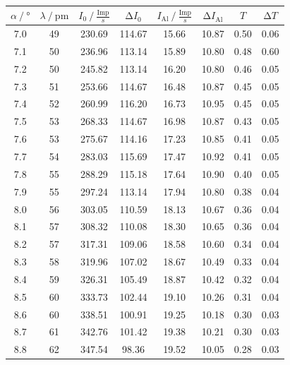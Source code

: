 \begin{table}[H]    
    \centering
    \caption{}
    \label{Tabelle3}
    \begin{tabular} {c  c| c  c|  c  c|  c|  c}
        \toprule
        {$ \alpha \mathbin{/} \unit{\degree}$} &
        {$ \lambda \mathbin{/} \unit{\pico\meter}$} &
        {$ I_{0} \mathbin{/} \frac{\text{Imp}}{s} $} &
        {$ \increment I_{0} $} &
        {$ I_{\text{Al}} \mathbin{/} \frac{\text{Imp}}{s} $} &
        {$ \increment I_{\text{Al}} $} &
        {$ T $} &
        {$ \increment T $} \\
        \midrule
        7.0  & 49 & 230.69 & 114.67 & 15.66 & 10.87 & 0.50 & 0.06 \\ 
        7.1  & 50 & 236.96 & 113.14 & 15.89 & 10.80 & 0.48 & 0.60 \\ 
        7.2  & 50 & 245.82 & 113.14 & 16.20 & 10.80 & 0.46 & 0.05 \\ 
        7.3  & 51 & 253.66 & 114.67 & 16.48 & 10.87 & 0.45 & 0.05 \\
        7.4  & 52 & 260.99 & 116.20 & 16.73 & 10.95 & 0.45 & 0.05 \\ 
        7.5  & 53 & 268.33 & 114.67 & 16.98 & 10.87 & 0.43 & 0.05 \\
        7.6  & 53 & 275.67 & 114.16 & 17.23 & 10.85 & 0.41 & 0.05 \\ 
        7.7  & 54 & 283.03 & 115.69 & 17.47 & 10.92 & 0.41 & 0.05 \\ 
        7.8  & 55 & 288.29 & 115.18 & 17.64 & 10.90 & 0.40 & 0.05 \\  
        7.9  & 55 & 297.24 & 113.14 & 17.94 & 10.80 & 0.38 & 0.04 \\
        8.0  & 56 & 303.05 & 110.59 & 18.13 & 10.67 & 0.36 & 0.04 \\  
        8.1  & 57 & 308.32 & 110.08 & 18.30 & 10.65 & 0.36 & 0.04 \\
        8.2  & 57 & 317.31 & 109.06 & 18.58 & 10.60 & 0.34 & 0.04 \\ 
        8.3  & 58 & 319.96 & 107.02 & 18.67 & 10.49 & 0.33 & 0.04 \\ 
        8.4  & 59 & 326.31 & 105.49 & 18.87 & 10.42 & 0.32 & 0.04 \\
        8.5  & 60 & 333.73 & 102.44 & 19.10 & 10.26 & 0.31 & 0.04 \\
        8.6  & 60 & 338.51 & 100.91 & 19.25 & 10.18 & 0.30 & 0.03 \\
        8.7  & 61 & 342.76 & 101.42 & 19.38 & 10.21 & 0.30 & 0.03 \\
        8.8  & 62 & 347.54 &  98.36 & 19.52 & 10.05 & 0.28 & 0.03 \\ 

\end{tabular}
\end{table}
